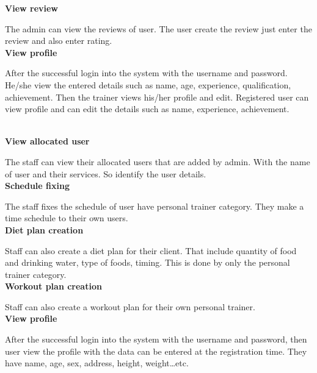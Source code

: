 \documentclass[a4paper,12pt,toc=flat]{report}
\begin{document}
{	{\bf \hspace{-20pt} View review }
	
	
	The admin can view the reviews of user.  The user  create the review just enter the review and also enter rating.
	\\
	{\bf \hspace{-20pt} View profile}
	
	
	After the successful login into the system with the username and password.  He/she view the entered details such as name, age, experience, qualification, achievement. Then the trainer views his/her profile and edit. Registered user can view profile and can edit the details such as name, experience, achievement.

	\\
	


	
	{\bf \hspace{-20pt} View allocated user}
	
	
	The staff can view their allocated users that are added by admin. With the name of user and their services. So identify the user details.\\
	
	{\bf \hspace{-20pt} Schedule fixing }
	
	The staff fixes the schedule of user have personal trainer category. They make a time schedule to their own  users. \\
	


	
	{\bf \hspace{-20pt} Diet plan creation}
	
	
	Staff can also create a diet plan for their client. That include quantity of food and drinking water, type of foods, timing. This is done by only the personal trainer category.
		\pagebreak\\
	{\bf \hspace{-20pt} Workout plan creation }
	
	Staff can also create a workout plan for their own personal trainer.\\

	
	{\bf \hspace{-20pt} View profile}
	
	
	After the successful login into the system with the username and password, then user view the profile with the data can be entered at the registration time. They have name, age, sex, address, height, weight…etc. 
	  \\
	
}
\end{document}

